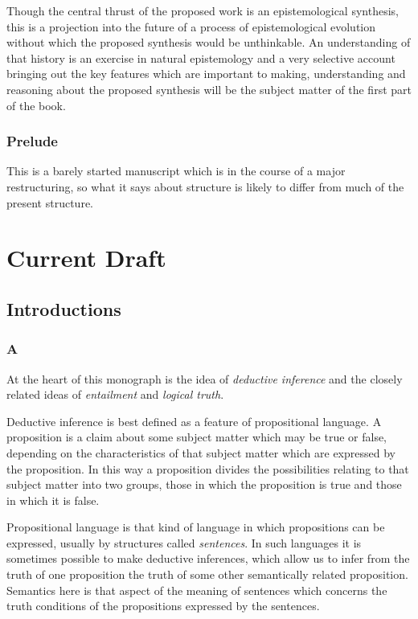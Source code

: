 \documentclass[10pt,titlepage]{book}
\begin{document}
Though the central thrust of the proposed work is an epistemological synthesis, this is a projection into the future of a process of epistemological evolution without which the proposed synthesis would be unthinkable.  An understanding of that history is an exercise in natural epistemology and a very selective account bringing out the key features which are important to making, understanding and reasoning about the proposed synthesis will be the subject matter of the first part of the book.

\section*{Prelude}

This is a barely started manuscript which is in the course of a major restructuring, so what it says about structure is likely to differ from much of the present structure.

\part{Current Draft}

\chapter{Introductions}

\section{A}

At the heart of this monograph is the idea of \emph{deductive inference} and the closely related ideas of \emph{entailment} and \emph{logical truth}.

Deductive inference is best defined as a feature of propositional language.
A proposition is a claim about some subject matter which may be true or false, depending on the characteristics of that subject matter which are expressed by the proposition.
In this way a proposition divides the possibilities relating to that subject matter into two groups, those in which the proposition is true and those in which it is false.

Propositional language is that kind of language in which propositions can be expressed, usually by structures called \emph{sentences}.
In such languages it is sometimes possible to make deductive inferences, which allow us to infer from the truth of one proposition the truth of some other semantically related proposition.
Semantics here is that aspect of the meaning of sentences which concerns the truth conditions of the propositions expressed by the sentences.
\end{document}
